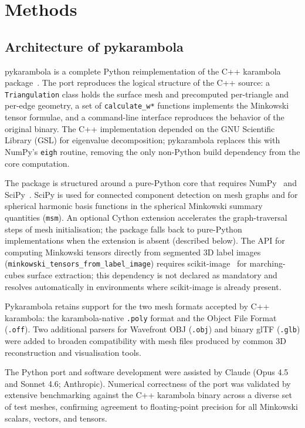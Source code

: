 \documentclass[times, twoside, watermark]{zHenriquesLab-StyleBioRxiv}
\begin{document}
\section*{Methods}

\subsection*{Architecture of pykarambola}
pykarambola is a complete Python reimplementation of the C++ karambola package~\cite{Schaller2020karambola}.
The port reproduces the logical structure of the C++ source: a \texttt{Triangulation} class holds the surface mesh and precomputed per-triangle and per-edge geometry, a set of \texttt{calculate\_w*} functions implements the Minkowski tensor formulae, and a command-line interface reproduces the behavior of the original binary.
The C++ implementation depended on the GNU Scientific Library (GSL) for eigenvalue decomposition; pykarambola replaces this with NumPy's \texttt{eigh} routine, removing the only non-Python build dependency from the core computation.

The package is structured around a pure-Python core that requires NumPy~\cite{harris2020numpy} and SciPy~\cite{virtanen2020scipy}.
SciPy is used for connected component detection on mesh graphs and for spherical harmonic basis functions in the spherical Minkowski summary quantities (\texttt{msm}).
An optional Cython extension accelerates the graph-traversal steps of mesh initialisation; the package falls back to pure-Python implementations when the extension is absent (described below).
The API for computing Minkowski tensors directly from segmented 3D label images (\texttt{minkowski\_tensors\_from\_label\_image}) requires scikit-image~\cite{vanderwalt2014scikit} for marching-cubes surface extraction; this dependency is not declared as mandatory and resolves automatically in environments where scikit-image is already present.

Pykarambola retains support for the two mesh formats accepted by C++ karambola: the karambola-native \texttt{.poly} format and the Object File Format (\texttt{.off}).
Two additional parsers for Wavefront OBJ (\texttt{.obj}) and binary glTF (\texttt{.glb}) were added to broaden compatibility with mesh files produced by common 3D reconstruction and visualisation tools.

The Python port and software development were assisted by Claude (Opus 4.5 and Sonnet 4.6; Anthropic).
Numerical correctness of the port was validated by extensive benchmarking against the C++ karambola binary across a diverse set of test meshes, confirming agreement to floating-point precision for all Minkowski scalars, vectors, and tensors.
\end{document}

